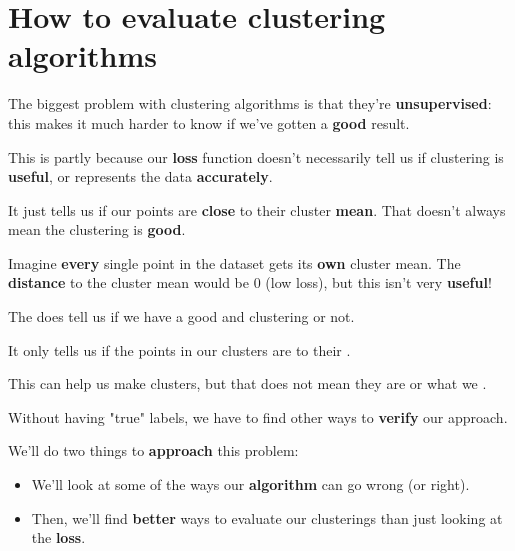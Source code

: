 
\section*{How to evaluate clustering algorithms}

    The biggest problem with clustering algorithms is that they're \textbf{unsupervised}: this makes it much harder to know if we've gotten a \textbf{good} result.
    
    This is partly because our \textbf{loss} function doesn't necessarily tell us if clustering is \textbf{useful}, or represents the data \textbf{accurately}.
    
    It just tells us if our points are \textbf{close} to their cluster \textbf{mean}. That doesn't always mean the clustering is \textbf{good}.
    
    \miniex Imagine \textbf{every} single point in the dataset gets its \textbf{own} cluster mean. The \textbf{distance} to the cluster mean would be 0 (low loss), but this isn't very \textbf{useful}!
        \\
    
    \begin{clarification}
        The  does  tell us if we have a good and  clustering or not.
        
        It only tells us if the points in our clusters are  to their .
        
        This can help us make  clusters, but that does not mean they are  or what we .
    \end{clarification}
    
    Without having "true" labels, we have to find other ways to \textbf{verify} our approach.
    
    We'll do two things to \textbf{approach} this problem:
    
    \begin{itemize}
        \item We'll look at some of the ways our \textbf{algorithm} can go wrong (or right).
        
        \item Then, we'll find \textbf{better} ways to evaluate our clusterings than just looking at the \textbf{loss}.
    \end{itemize}
    
